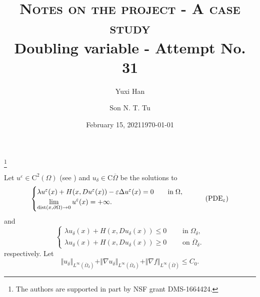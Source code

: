 \documentclass[11pt,reqno]{amsart}
\numberwithin{figure}{section}
\theoremstyle{plain}
\theoremstyle{remark}
\numberwithin{equation}{section}
\begin{document}
\title[Rate of convergence]
{\textsc{Notes on the project - A case study}\\ {\small Doubling variable - Attempt No. 31}}
\thanks{The authors are supported in part by NSF grant DMS-1664424.}
\date{February 15, 2021}
\author{Yuxi Han}
\address[Y. Han]
{
Department of Mathematics, 
University of Wisconsin Madison, 480 Lincoln  Drive, Madison, WI 53706, USA}
\author{Son N. T. Tu}
\address[S. N.T. Tu]
{
Department of Mathematics, 
University of Wisconsin Madison, 480 Lincoln  Drive, Madison, WI 53706, USA}
\date{\today}
\maketitle
\setcounter{tocdepth}{1}



\noindent Let $u^\varepsilon\in \mathrm{C}^2(\Omega)$ (see \cite{Lasry1989}) and $u_\delta\in \mathrm{C}{\overline{\Omega}}$ be the solutions to 
\begin{equation}\label{eq:PDEeps}
    \begin{cases}
    \lambda u^\varepsilon(x) + H(x,Du^\varepsilon(x)) - \varepsilon \Delta u^\varepsilon(x) = 0 \qquad
    \text{in}\;\Omega, \vspace{0cm}\\
    \displaystyle  \lim_{\mathrm{dist}(x,\partial \Omega)\to 0} u^\varepsilon(x) = +\infty.
    \end{cases} \tag{PDE$_\varepsilon$}
\end{equation}
and
\begin{equation}\label{eq:PDE0}
    \begin{cases}
     \lambda u_\delta(x) + H(x,Du_\delta(x)) \leq 0\;\qquad\text{in}\;\Omega_\delta,\\
     \lambda u_\delta(x) + H(x,Du_\delta(x)) \geq 0\;\qquad\text{on}\;\overline{\Omega}_\delta.
    \end{cases} \tag{PDE$_\delta$}
\end{equation}
respectively. Let
\begin{equation*}
    \Vert u_\delta\Vert_{L^\infty(\overline{\Omega}_\delta)} + \Vert \nabla u_\delta\Vert_{L^\infty(\overline{\Omega}_\delta)} + \Vert \nabla f\Vert_{L^\infty(\overline{\Omega})} \leq C_0.
\end{equation*}
\end{document}
